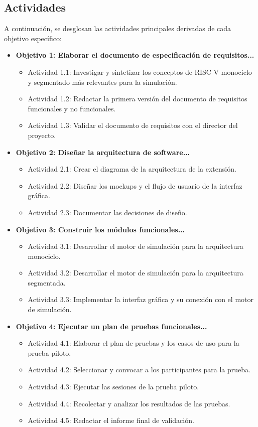 \documentclass[12pt, letterpaper]{article}
\begin{document}
\subsection{Actividades}
A continuación, se desglosan las actividades principales derivadas de cada objetivo específico:
\begin{itemize}
    \item \textbf{Objetivo 1: Elaborar el documento de especificación de requisitos...}
    \begin{itemize}
        \item Actividad 1.1: Investigar y sintetizar los conceptos de RISC-V monociclo y segmentado más relevantes para la simulación.
        \item Actividad 1.2: Redactar la primera versión del documento de requisitos funcionales y no funcionales.
        \item Actividad 1.3: Validar el documento de requisitos con el director del proyecto.
    \end{itemize}
    \item \textbf{Objetivo 2: Diseñar la arquitectura de software...}
    \begin{itemize}
        \item Actividad 2.1: Crear el diagrama de la arquitectura de la extensión.
        \item Actividad 2.2: Diseñar los mockups y el flujo de usuario de la interfaz gráfica.
        \item Actividad 2.3: Documentar las decisiones de diseño.
    \end{itemize}
    \item \textbf{Objetivo 3: Construir los módulos funcionales...}
    \begin{itemize}
        \item Actividad 3.1: Desarrollar el motor de simulación para la arquitectura monociclo.
        \item Actividad 3.2: Desarrollar el motor de simulación para la arquitectura segmentada.
        \item Actividad 3.3: Implementar la interfaz gráfica y su conexión con el motor de simulación.
    \end{itemize}
    \item \textbf{Objetivo 4: Ejecutar un plan de pruebas funcionales...}
    \begin{itemize}
        \item Actividad 4.1: Elaborar el plan de pruebas y los casos de uso para la prueba piloto.
        \item Actividad 4.2: Seleccionar y convocar a los participantes para la prueba.
        \item Actividad 4.3: Ejecutar las sesiones de la prueba piloto.
        \item Actividad 4.4: Recolectar y analizar los resultados de las pruebas.
        \item Actividad 4.5: Redactar el informe final de validación.
    \end{itemize}
\end{itemize}
\end{document}
